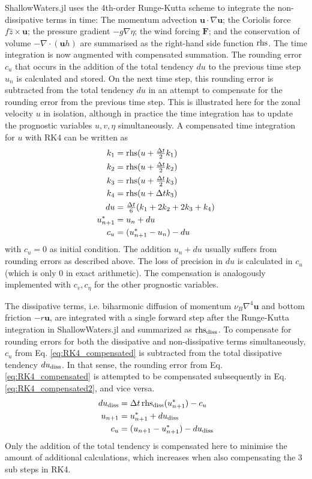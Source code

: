 ShallowWaters.jl uses the 4th-order Runge-Kutta scheme \citep{Butcher2008} to integrate the non-dissipative terms in time:
The momentum advection $\mathbf{u} \cdot \nabla \mathbf{u}$;
the Coriolis force $f\hat{z} \times \mathbf{u}$;
the pressure gradient $-g\nabla \eta$;
the wind forcing $\mathbf{F}$;
and the conservation of volume $-\nabla \cdot (\mathbf{u} h)$ are summarised as the right-hand side function $\operatorname{rhs}$.
The time integration is now augmented with compensated summation. The rounding error $c_u$ that occurs in the addition
of the total tendency $du$ to the previous time step $u_n$ is calculated and stored. On the next time step, this rounding error
is subtracted from the total tendency $du$ in an attempt to compensate for the rounding error from the previous time step.
This is illustrated here for the zonal velocity $u$ in isolation, although in practice the time integration has to update the
prognostic variables $u,v,\eta$ simultaneously. A compensated time integration for $u$ with RK4 can be written as
\begin{align}
k_1 &= \operatorname{rhs}(u + \tfrac{\Delta t}{2}k_1) \nonumber \\
k_2 &= \operatorname{rhs}(u + \tfrac{\Delta t}{2}k_2) \nonumber \\
k_3 &= \operatorname{rhs}(u + \tfrac{\Delta t}{2}k_3) \nonumber \\
k_4 &= \operatorname{rhs}(u + \Delta t k_3) \nonumber \\
du &= \tfrac{\Delta t}{6}(k_1 + 2k_2 + 2k_3 + k_4) \nonumber \\
u_{n+1}^* &= u_n + du \nonumber \\
c_u &= (u^*_{n+1} - u_n) - du
\label{eq:RK4_compensated}
\end{align}
with $c_u = 0$ as initial condition. The addition $u_n + du$ usually suffers from rounding errors as described above.
The loss of precision in $du$ is calculated in $c_u$ (which is only 0 in exact arithmetic). The compensation is analogously
implemented with $c_v,c_\eta$  for the other prognostic variables.  

The dissipative terms, i.e. biharmonic diffusion of momentum $\nu_B\nabla^4\mathbf{u}$ and bottom friction $-r\mathbf{u}$,
are integrated with a single forward step after the Runge-Kutta integration in ShallowWaters.jl and summarized as 
$\operatorname{rhs}_{\operatorname{diss}}$. To compensate for rounding errors for both the dissipative and non-dissipative terms simultaneously,
$c_u$ from Eq. \ref{eq:RK4_compensated} is subtracted from the total dissipative tendency $du_{\operatorname{diss}}$.
In that sense, the rounding error from Eq. \ref{eq:RK4_compensated} is attempted to be compensated subsequently
in Eq. \ref{eq:RK4_compensated2}, and vice versa.
\begin{align}
du_{\operatorname{diss}} &= \Delta t \operatorname{rhs}_{\operatorname{diss}}(u_{n+1}^*) - c_u \nonumber \\
u_{n+1} &= u^*_{n+1} + du_{\operatorname{diss}} \nonumber \\
c_u &= (u_{n+1} - u_{n+1}^*) - du_{\operatorname{diss}}
\label{eq:RK4_compensated2}
\end{align}
Only the addition of the total tendency is compensated here to minimise the amount of additional calculations, which
increases when also compensating the 3 sub steps in RK4.

